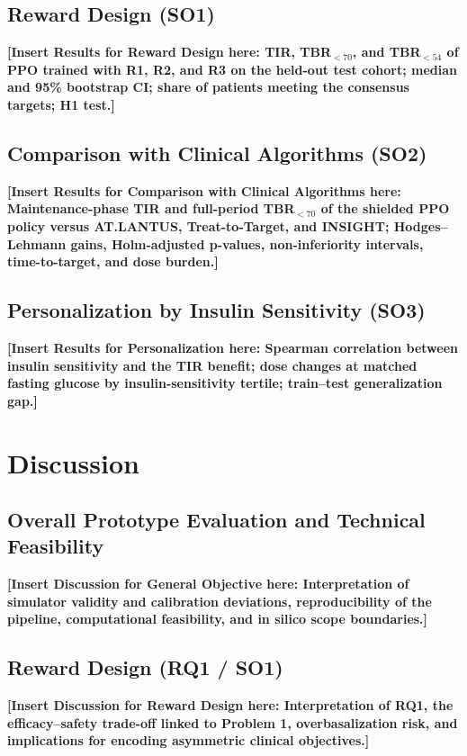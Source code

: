 \documentclass[conference]{IEEEtran}
\begin{document}
\subsection{Reward Design (SO1)}
\textbf{[Insert Results for Reward Design here: TIR, TBR$_{<70}$, and TBR$_{<54}$ of PPO trained with R1, R2, and R3 on the held-out
test cohort; median and 95\% bootstrap CI; share of patients meeting the consensus targets; H1
test.]}

\subsection{Comparison with Clinical Algorithms (SO2)}
\textbf{[Insert Results for Comparison with Clinical Algorithms here: Maintenance-phase TIR and full-period TBR$_{<70}$ of the shielded PPO policy versus
AT.LANTUS, Treat-to-Target, and INSIGHT; Hodges--Lehmann gains, Holm-adjusted p-values,
non-inferiority intervals, time-to-target, and dose burden.]}

\subsection{Personalization by Insulin Sensitivity (SO3)}
\textbf{[Insert Results for Personalization here: Spearman correlation between insulin sensitivity and the TIR benefit; dose changes at
matched fasting glucose by insulin-sensitivity tertile; train--test generalization gap.]}

\newpage
\section{Discussion}

\subsection{Overall Prototype Evaluation and Technical Feasibility}
\textbf{[Insert Discussion for General Objective here: Interpretation of simulator validity and calibration deviations, reproducibility of
the pipeline, computational feasibility, and in silico scope boundaries.]}

\subsection{Reward Design (RQ1 / SO1)}
\textbf{[Insert Discussion for Reward Design here: Interpretation of RQ1, the efficacy--safety trade-off linked to Problem 1,
overbasalization risk, and implications for encoding asymmetric clinical objectives.]}
\end{document}
